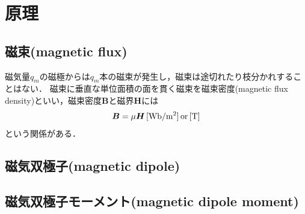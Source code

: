 \clearpage

\section{原理}
\subsection{磁束(magnetic flux)\cite{113028227042}}
磁気量$q_{m}$の磁極からは$q_{m}$本の磁束が発生し，磁束は途切れたり枝分かれすることはない．
磁束に垂直な単位面積の面を貫く磁束を磁束密度(magnetic flux density)といい，磁束密度$\boldsymbol{B}$と磁界$\boldsymbol{H}$には
\begin{equation}
	\boldsymbol{B}=\mu\boldsymbol{H}\,[\rm{Wb/m^{2}}] \,or\, [\rm{T}] 
\end{equation}
という関係がある．

\subsection{磁気双極子(magnetic dipole)}

\subsection{磁気双極子モーメント(magnetic dipole moment)}

